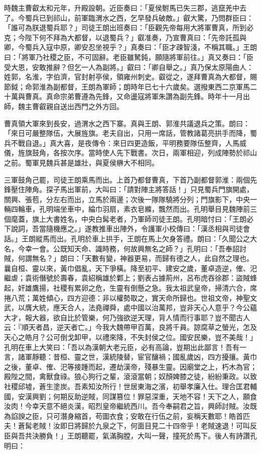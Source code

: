 時魏主曹叡太和元年，升殿設朝。近臣奏曰：「夏侯駙馬已失三郡，逃竄羌中去了。今蜀兵已到祁山，前軍臨渭水之西，乞早發兵破敵。」叡大驚，乃問群臣曰：「誰可為朕退蜀兵耶？」司徒王朗出班奏曰：「臣觀先帝每用大將軍曹真，所到必克；今陛下何不拜為大都督，以退蜀兵？」叡准奏，乃宣曹真曰：「先帝託孤與卿，今蜀兵入寇中原，卿安忍坐視乎？」真奏曰：「臣才疎智淺，不稱其職。」王朗曰：「將軍乃社稷之臣，不可固辭。老臣雖駑鈍，願隨將軍前往。」真又奏曰：「臣受大恩，安敢推辭？但乞一人為副將。」叡曰：「卿自舉之。」真乃保太原陽曲人：姓郭，名淮，字伯濟，官封射亭侯，領雍州刺史。叡從之，遂拜曹真為大都督，賜節鉞；命郭淮為副都督，王朗為軍師；朗時年已七十六歲矣。選撥東西二京軍馬二十萬與曹真。真命宗弟曹遵為先鋒，又命盪寇將軍朱讚為副先鋒。時年十一月出師，魏主曹叡親自送出西門之外方回。

曹真領大軍來到長安，過渭水之西下寨。真與王朗、郭淮共議退兵之策。朗曰：「來日可嚴整隊伍，大展旌旗。老夫自出，只用一席話，管教諸葛亮拱手而降，蜀兵不戰自退。」真大喜，是夜傳令：來日四更造飯，平明務要隊伍整齊，人馬威儀，旌旗鼓角，各按次序。當時使人先下戰書。次日，兩軍相迎，列成陣勢於祁山之前。蜀軍見魏兵甚是雄壯，與夏侯楙大不相同。

三軍鼓角己罷，司徒王朗乘馬而出。上首乃都督曹真，下首乃副都督郭淮：兩個先鋒壓住陣角。探子馬出軍前，大叫曰：「請對陣主將答話！」只見蜀兵門旗開處，關興、張苞，分左右而出，立馬於兩邊；次後一隊隊驍將分列；門旗影下，中央一輛四輪車，孔明端坐車中，綸巾羽扇，素衣皂縧，飄然而出。孔明舉目見魏陣前三個麾蓋，旗上大書姓名，中央白髯老者，乃軍師司徒王朗。孔明暗忖曰：「王朗必下說詞，吾當隨機應之。」遂教推車出陣外，令護軍小校傳曰：「漢丞相與司徒會話。」王朗縱馬而出。孔明於車上拱手，王朗在馬上欠身答禮。朗曰：「久聞公之大名，今幸一會。公既知天命、識時務，何故興無名之師？」孔明曰：「吾奉詔討賊，何謂無名？」朗曰：「天數有變，神器更易，而歸有德之人，此自然之理也。曩自桓、靈以來，黃巾倡亂，天下爭橫。降至初平、建安之歲，董卓造逆，傕、汜繼虐；袁術僭號於壽春，袁紹稱雄於鄴上；劉表占據荊州，呂布虎吞徐郡：盜賊蜂起，奸雄鷹揚，社稷有累卵之危，生靈有倒懸之急。我太祖武皇帝，掃清六合，席捲八荒；萬姓傾心，四方迎德：非以權勢取之，實天命所歸也。世祖文帝，神聖文武，以膺大統，應天合人，法堯禪舜，處中國以治萬邦，豈非天心人意乎？今公蘊大才，報大器，欲自比於管樂，何乃強欲逆天理，背人情而行事耶？豈不聞古人云：『順天者昌，逆天者亡。」今我大魏帶甲百萬，良將千員。諒腐草之螢光，怎及天心之皓月？公可倒戈卸甲，以禮來降，不失封侯之位。國安民樂，豈不美哉！」孔明在車上大笑曰：「吾以為漢朝大老元臣，必有高論，豈期出此鄙言！吾有一言，諸軍靜聽：昔桓、靈之世，漢統陵替，宦官釀禍；國亂歲凶，四方擾攘。黃巾之後，董卓、傕、汜等接踵而起，遷劫漢帝，殘暴生靈。因廟堂之上，朽木為官；殿陛之間，禽獸食祿。狼心狗行之輩，滾滾當朝；奴顏婢膝之徒，紛紛秉政。以致社稷邱墟，蒼生塗炭。吾素知汝所行！世居東海之濱，初舉孝廉入仕。理合匡君輔國，安漢興劉；何期反助逆賊，同謀篡位！罪惡深重，天地不容！天下之人，願食汝肉！今幸天意不絕炎漢，昭烈皇帝繼統西川。吾今奉嗣君之旨，興師討賊。汝既為諂諛之臣，只可潛身縮首，苟圖衣食；安敢在行伍之前，妄稱天數耶！皓首匹夫！蒼髯老賊！汝即日將歸於九泉之下，何面目見二十四帝乎！老賊速退！可叫反臣與吾共決勝負！」王朗聽罷，氣滿胸膛，大叫一聲，撞死於馬下。後人有詩讚孔明曰：

